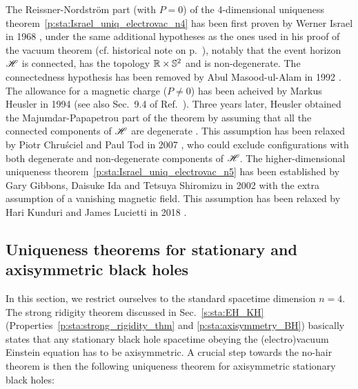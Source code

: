 \begin{hist}
\label{h:sta:Israel_thm_electrovac}
The Reissner-Nordström part (with $P=0$)
of the 4-dimensional uniqueness theorem~\ref{p:sta:Israel_uniq_electrovac_n4}
has been first proven by Werner Israel
in 1968 \cite{Israe68},
under the same additional hypotheses as the ones used in his proof of the vacuum
theorem (cf. historical note on p.~\pageref{h:sta:Israel_thm_vacuum}), notably
that the event horizon $\mathscr{H}$ is connected, has the topology $\mathbb{R}\times\mathbb{S}^2$ and is non-degenerate.
The connectedness hypothesis has been removed by
Abul Masood-ul-Alam in 1992 \cite{Masoo92}.
The allowance for a magnetic charge ($P\neq 0$) has been acheived by Markus Heusler in 1994 \cite{Heusl94} (see also Sec.~9.4 of Ref.~\cite{Heusl96}).
Three years later, Heusler obtained the Majumdar-Papapetrou part of the theorem
by assuming that all the connected components of $\mathscr{H}$ are degenerate \cite{Heusl97}.
This assumption has been relaxed by
Piotr Chru\'sciel and Paul Tod
in 2007 \cite{ChrusT07}, who could exclude configurations with both degenerate
and non-degenerate components of $\mathscr{H}$.
The higher-dimensional uniqueness theorem~\ref{p:sta:Israel_uniq_electrovac_n5}
has been established by Gary Gibbons, Daisuke Ida
and Tetsuya Shiromizu in 2002 \cite{GibboIS02a}
with the extra assumption of a vanishing magnetic field. This assumption
has been relaxed by Hari Kunduri and James Lucietti
in 2018 \cite{KunduL18}.
\end{hist}



\subsection{Uniqueness theorems for stationary and axisymmetric black holes}
\label{s:sta:uniqueness_axisym}

In this section, we restrict ourselves to the standard spacetime dimension $n=4$.
The strong ridigity theorem discussed in Sec.~\ref{s:sta:EH_KH} (Properties~\ref{p:sta:strong_rigidity_thm} and \ref{p:sta:axisymmetry_BH})
basically states that any stationary black hole spacetime obeying the (electro)vacuum Einstein
equation has to be axisymmetric.
A crucial step towards the no-hair theorem is then the following uniqueness theorem
for axisymmetric stationary black holes:

